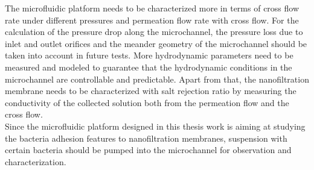 The microfluidic platform needs to be characterized more in terms of cross flow rate under different pressures and permeation flow rate with cross flow. For the calculation of the pressure drop along the microchannel, the pressure loss due to inlet and outlet orifices and the meander geometry of the microchannel should be taken into account in future tests. More hydrodynamic parameters need to be measured and modeled to guarantee that the hydrodynamic conditions in the microchannel are controllable and predictable. Apart from that, the nanofiltration membrane needs to be characterized with salt rejection ratio by measuring the conductivity of the collected solution both from the permeation flow and the cross flow. \\

Since the microfluidic platform designed in this thesis work is aiming at studying the bacteria adhesion features to nanofiltration membranes, suspension with certain bacteria should be pumped into the microchannel for observation and characterization.



































